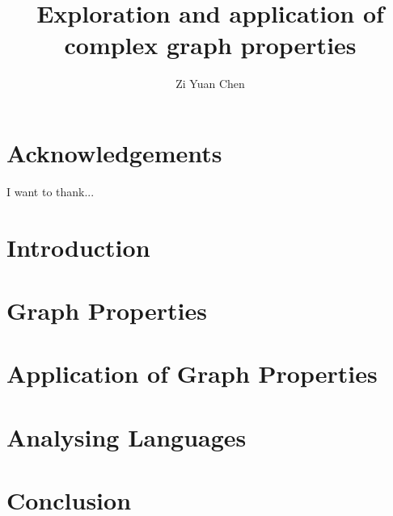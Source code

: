 \documentclass[12pt]{report}
\title{Exploration and application of complex graph properties}
\author{Zi Yuan Chen}
\date{}
\begin{document}







\chapter*{Acknowledgements}
I want to thank...

\tableofcontents


\listoffigures

\listoftables


\chapter{Introduction}


\chapter{Graph Properties}


\chapter{Application of Graph Properties}


\chapter{Analysing Languages}


\chapter{Conclusion}






\end{document}
